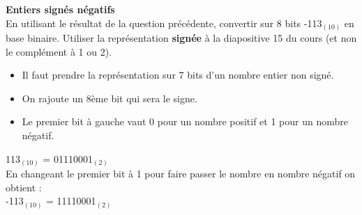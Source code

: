\begin{Exercice}[5 minutes] \textbf{Entiers signés négatifs}\\
    En utilisant le résultat de la question précédente, convertir sur 8 bits -113$_{(10)}$ en base binaire. Utiliser la représentation \textbf{signée} à la diapositive 15 du cours (et non le complément à 1 ou 2). \\

    \begin{conseil}
        \begin{itemize}
        	\item Il faut prendre la représentation sur 7 bits d'un nombre entier non signé.
        	\item On rajoute un 8ème bit qui sera le signe.
        	\item Le premier bit à gauche vaut 0 pour un nombre positif et 1 pour un nombre négatif.
        \end{itemize} 
    \end{conseil}
    
    \begin{solution}
         113$_{(10)}$ = 01110001$_{(2)}$ \\
         
         En changeant le premier bit à 1 pour faire passer le nombre en nombre négatif on obtient : \\
         
         -113$_{(10)}$ = 11110001$_{(2)}$ \\
    \end{solution}
\end{Exercice}

